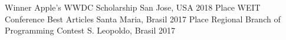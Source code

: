 \begin{cvhonors}
  \cvhonor
    {Winner}
    {Apple's WWDC Scholarship}
    {San Jose, USA}
    {2018}
  \cvhonor
    { Place}
    {WEIT Conference Best Articles}
    {Santa Maria, Brasil}
    {2017}
  \cvhonor
    { Place}
    {Regional Branch of Programming Contest}
    {S. Leopoldo, Brasil}
    {2017}
\end{cvhonors}
